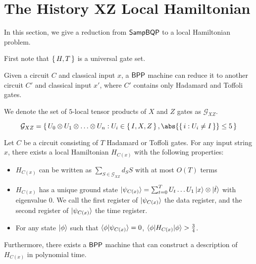\section{The History XZ Local Hamiltonian}
\label{sec:Hamiltonian}

In this section, we give a reduction from $\operatorname{\mathsf{SampBQP}}$ to a local Hamiltonian problem. 



First note that $\set{H, T}$ is a universal gate set.


\begin{thm}
	Given a circuit $C$ and classical input $x$, a $\operatorname{\mathsf{BPP}}$ machine can reduce it to another circuit $C'$ and classical input $x'$, where $C'$ contains only Hadamard and Toffoli gates.
\end{thm}

 
 
 We denote the set of $5$-local tensor products of $X$ and $Z$ gates as $\mathcal{G}_{XZ}$.%

\begin{definition}
	$$\mathcal{G}_{XZ}=\set{U_0\otimes U_1\otimes\ldots\otimes U_n: U_i\in\set{I,X,Z}, \abs{\set{i: U_i\ne I}}\leq 5}$$
\end{definition}



\begin{thm}
	Let $C$ be a circuit consisting of $T$ Hadamard or Toffoli gates. For any input string $x$,  there exists a local Hamiltonian $H_{C(x)}$  with the following properties:
	\begin{itemize}
		\item $H_{C(x)}$ can be written as $\sum_{S\in\mathcal{G}_{XZ}} d_S S$ with at most $O(T)$ terms
		\item $H_{C(x)}$ has a unique ground state  $\ket{\psi_{C(x)}}=\sum_{t=0}^TU_t\ldots U_1\ket{x}\otimes\ket{\hat{t}}$ with eigenvalue $0$. We call the first register of $\ket{\psi_{C(x)}}$ the data register, and the second register of $\ket{\psi_{C(x)}}$ the time register.
		\item For any state $\ket\phi$ such that $\braket{\phi|\psi_{C(x)}}=0$,  $\braket{\phi|H_{C(x)}|\phi}>\frac{3}{4}$.
	\end{itemize}
	
	Furthermore, there exists a $\operatorname{\mathsf{BPP}}$ machine that can construct a description of $H_{C(x)}$ in polynomial time.
\end{thm}

